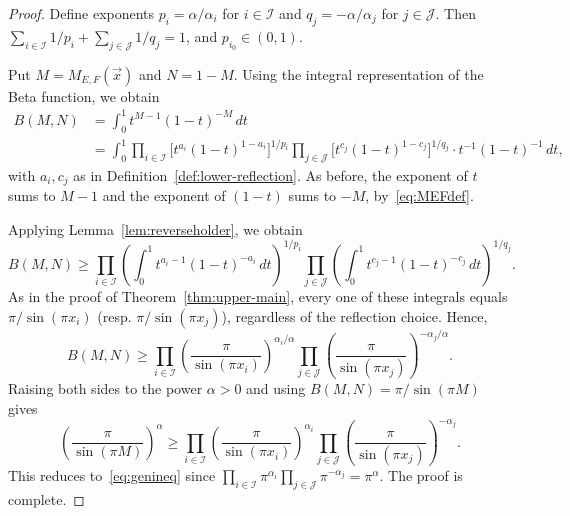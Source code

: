 \documentclass[10pt,a4paper]{amsart}
\begin{document}
\begin{proof}
Define exponents $p_i = \alpha/\alpha_i$ for $i\in\mathcal I$ and $q_j = -\alpha/\alpha_j$
for $j\in\mathcal J$. Then $\sum_{i\in\mathcal I} 1/p_i + \sum_{j\in\mathcal J} 1/q_j = 1$,
and $p_{i_0}\in(0,1)$.

Put $M = M_{E,F}(\vec x)$ and $N = 1-M$. Using the integral representation of the Beta
function, we obtain
\begin{align*}
B(M,N) &= \int_0^1 t^{M-1}(1-t)^{-M}\,dt \\
&= \int_0^1 \prod_{i\in\mathcal I} \bigl[ t^{a_i}(1-t)^{1-a_i} \bigr]^{1/p_i}
         \prod_{j\in\mathcal J} \bigl[ t^{c_j}(1-t)^{1-c_j} \bigr]^{1/q_j}
         \cdot t^{-1}(1-t)^{-1} \, dt,
\end{align*}
with $a_i,c_j$ as in Definition~\ref{def:lower-reflection}. As before, the exponent of $t$
sums to $M-1$ and the exponent of $(1-t)$ sums to $-M$, by~\eqref{eq:MEFdef}.

Applying Lemma~\ref{lem:reverseholder}, we obtain
\[
B(M,N) \ge \prod_{i\in\mathcal I} \left( \int_0^1 t^{a_i-1}(1-t)^{-a_i} \, dt \right)^{1/p_i}
         \prod_{j\in\mathcal J} \left( \int_0^1 t^{c_j-1}(1-t)^{-c_j} \, dt \right)^{1/q_j}.
\]
As in the proof of Theorem~\ref{thm:upper-main}, every one of these integrals equals
$\pi/\sin(\pi x_i)$ (resp. $\pi/\sin(\pi x_j)$), regardless of the reflection choice. Hence,
\[
B(M,N) \ge \prod_{i\in\mathcal I} \left( \frac{\pi}{\sin(\pi x_i)} \right)^{\alpha_i/\alpha}
         \prod_{j\in\mathcal J} \left( \frac{\pi}{\sin(\pi x_j)} \right)^{-\alpha_j/\alpha}.
\]
Raising both sides to the power $\alpha>0$ and using $B(M,N)=\pi/\sin(\pi M)$ gives
\[
\left(\frac{\pi}{\sin(\pi M)}\right)^{\alpha} \ge \prod_{i\in\mathcal I} \left( \frac{\pi}{\sin(\pi x_i)} \right)^{\alpha_i}
         \prod_{j\in\mathcal J} \left( \frac{\pi}{\sin(\pi x_j)} \right)^{-\alpha_j}.
\]
This reduces to~\eqref{eq:genineq} since $\displaystyle\prod_{i\in\mathcal I}\pi^{\alpha_i}\prod_{j\in\mathcal J}\pi^{-\alpha_j}=\pi^\alpha$.
The proof is complete.
\end{proof}
\end{document}
